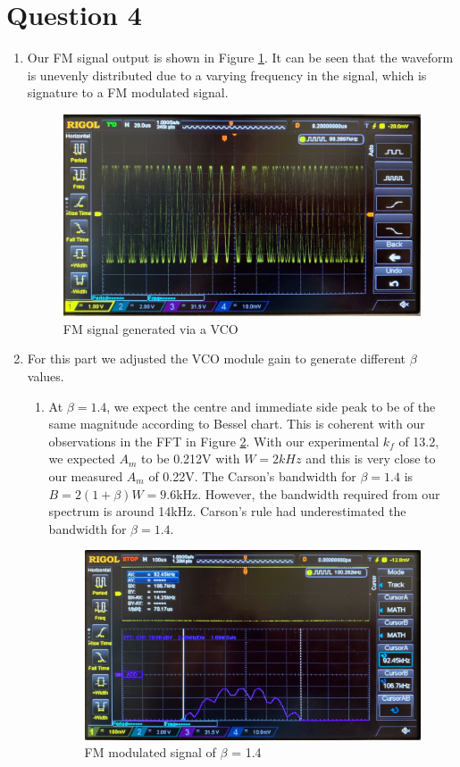 \documentclass[11pt]{article}
\begin{document}
\newpage
\section*{Question 4}
\begin{enumerate}[label=(\alph*)]
\item %
Our FM signal output is shown in Figure \ref{fig:W3Q4a}. It can be seen that the waveform is unevenly distributed due to a varying frequency in the signal, which is signature to a FM modulated signal. 
\begin{figure}[H]
    \centering
    \includegraphics[width=15cm]{W3Q4a.jpg}
    \caption{FM signal generated via a VCO}
    \label{fig:W3Q4a}
\end{figure}
\item %
For this part we adjusted the VCO module gain to generate different $\beta$ values. 

\begin{enumerate}
    \item %
    At $\beta = 1.4$, we expect the centre and immediate side peak to be of the same magnitude according to Bessel chart. This is coherent with our observations in the FFT in Figure \ref{fig:W3Q4bB1_4}. With our experimental $k_f$ of 13.2, we expected $A_m$ to be 0.212V with $W=2kHz$ and this is very close to our measured $A_m$ of 0.22V. 
    The Carson's bandwidth for $\beta = 1.4$ is $B = 2(1 + \beta)W = 9.6$kHz. However, the bandwidth required from our spectrum is around 14kHz. Carson's rule had underestimated the bandwidth for $\beta=1.4$. 
    \begin{figure}[H]
    \centering
    \includegraphics[width=15cm]{W3Q4bB1_4.jpg}
    \caption{FM modulated signal of $\beta$ = 1.4}
    \label{fig:W3Q4bB1_4}
    \end{figure}
    

\end{enumerate}
\end{enumerate}
\end{document}
